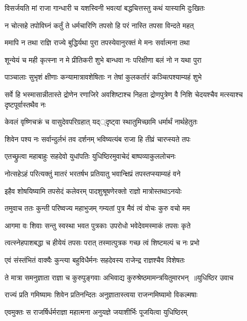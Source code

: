 \twolineshloka
{विसर्जयति मां राजा गान्धारी च यशस्विनी}
{भवत्यां बद्धचित्तस्तु कथं यास्यामि दुःखितः}


\twolineshloka
{न चोत्सहे तपोविघ्नं कर्तुं ते धर्मचारिणि}
{तपसो हि परं नास्ति तपसा विन्दते महत्}


\twolineshloka
{ममापि न तथा राज्ञि राज्ये बुद्धिर्यथा पुरा}
{तपस्येवानुरक्तं मे मनः सर्वात्मना तथा}


\twolineshloka
{शून्येयं च मही कृत्स्ना न मे प्रीतिकरी शुभे}
{बान्धवा नः परिक्षीणा बलं नो न यथा पुरा}


\twolineshloka
{पाञ्चालाः सुभृशं क्षीणाः कन्यामात्रावशेषिताः}
{न तेषां कुलकर्तारं कञ्चित्पश्याम्यहं शुभे}


\threelineshloka
{सर्वे हि भस्मासान्नीतास्ते द्रोणेन रणाजिरे}
{अवशिष्टाश्च निहता द्रोणपुत्रेण वै निशि}
{चेदयश्चैव मत्स्याश्च दृष्टपूर्वास्तथैव नः}


\twolineshloka
{केवलं वृष्णिचक्रं च वासुदेवपरिग्रहात्}
{यद््दृष्ट्वा स्थातुमिच्छामि धर्मार्थं नार्थहेतुतः}


\twolineshloka
{शिवेन पश्य नः सर्वान्दुर्लभं तव दर्शनम्}
{भविष्यत्यंब राजा हि तीव्रं चारप्स्यते तपः}


\twolineshloka
{एतच्छ्रुत्वा महाबाहुः सहदेवो युधांपतिः}
{युधिष्ठिरमुवाचेदं बाष्पव्याकुललोचनः}


\twolineshloka
{नोत्सहेऽहं परित्यक्तुं मातरं भरतर्षभ}
{प्रतियातु भवान्क्षिप्रं तपस्तप्स्याम्यहं वने}


\twolineshloka
{इहैव शोषयिष्यामि तपसेदं कलेवरम्}
{पादशुश्रूषणेरक्तो राज्ञो मात्रोस्तथाऽनयोः}


\twolineshloka
{तमुवाच ततः कुन्ती परिष्वज्य महाभुजम्}
{गम्यतां पुत्र मैवं त्वं वोचः कुरु वचो मम}


\twolineshloka
{आगमा वः शिवाः सन्तु स्वस्था भवत पुत्रकाः}
{उपरोधो भवेदेवमस्माकं तपसः कृते}


\twolineshloka
{त्वत्स्नेहपाशबद्धा च हीयेयं तपसः परात्}
{तस्मात्पुत्रक गच्छ त्वं शिष्टमल्पं च नः प्रभो}


\twolineshloka
{एवं संस्तंभितं वाक्यैः कुन्त्या बहुविधैर्मनः}
{सहदेवस्य राजेन्द्र राज्ञश्चैव विशेषतः}


\threelineshloka
{ते मात्रा समनुज्ञाता राज्ञा च कुरुपुङ्गवाः}
{अभिवाद्य कुरुश्रेष्ठमामन्त्रयितुमारभन् ॥युधिष्ठिर उवाच}
{}


\twolineshloka
{राज्यं प्रति गमिष्यामः शिवेन प्रतिनन्दितः}
{अनुज्ञातास्त्वया राजन्गमिष्यामो विकल्मषाः}


\twolineshloka
{एवमुक्तः स राजर्षिर्धर्मराज्ञा महात्मना}
{अनुयज्ञे जयाशीर्भिः पूजयित्वा युधिष्ठिरम्}


